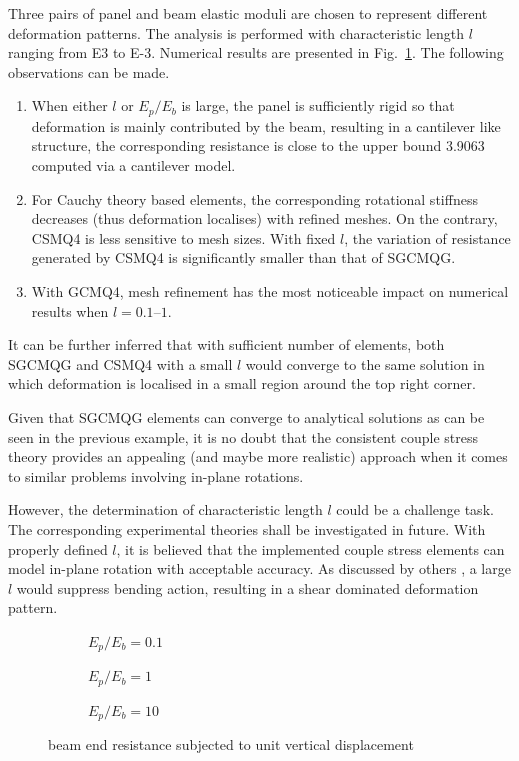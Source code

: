 \documentclass[3p,sort&compress,11pt,fleqn]{elsarticle}
\newcommand*{\figref}[1]{Fig.~\ref{#1}}
\begin{document}
Three pairs of panel and beam elastic moduli are chosen to represent different deformation patterns. The analysis is performed with characteristic length $l$ ranging from \num[print-unity-mantissa=false]{E3} to \num[print-unity-mantissa=false]{E-3}. Numerical results are presented in \figref{fig:joint}. The following observations can be made.
\begin{enumerate}
\item When either $l$ or $E_p/E_b$ is large, the panel is sufficiently rigid so that deformation is mainly contributed by the beam, resulting in a cantilever like structure, the corresponding resistance is close to the upper bound \num{3.9063} computed via a cantilever model.
\item For Cauchy theory based elements, the corresponding rotational stiffness decreases (thus deformation localises) with refined meshes. On the contrary, CSMQ4 is less sensitive to mesh sizes. With fixed $l$, the variation of resistance generated by CSMQ4 is significantly smaller than that of SGCMQG.
\item With GCMQ4, mesh refinement has the most noticeable impact on numerical results when $l=\numrange{0.1}{1}$.
\end{enumerate}

It can be further inferred that with sufficient number of elements, both SGCMQG and CSMQ4 with a small $l$ would converge to the same solution in which deformation is localised in a small region around the top right corner.

Given that SGCMQG elements can converge to analytical solutions as can be seen in the previous example, it is no doubt that the consistent couple stress theory provides an appealing (and maybe more realistic) approach when it comes to similar problems involving in-plane rotations.

However, the determination of characteristic length $l$ could be a challenge task. The corresponding experimental theories shall be investigated in future. With properly defined $l$, it is believed that the implemented couple stress elements can model in-plane rotation with acceptable accuracy. As discussed by others \citep[e.g.,][]{Darrall2013}, a large $l$ would suppress bending action, resulting in a shear dominated deformation pattern.
\begin{figure}[H]
\centering\footnotesize
\begin{subfigure}[b]{.99\textwidth}\centering

\caption{$E_p/E_b=0.1$}
\end{subfigure}
\begin{subfigure}[b]{.99\textwidth}\centering

\caption{$E_p/E_b=1$}
\end{subfigure}
\begin{subfigure}[b]{.99\textwidth}\centering

\caption{$E_p/E_b=10$}
\end{subfigure}
\caption{beam end resistance subjected to unit vertical displacement}\label{fig:joint}
\end{figure}
\end{document}
